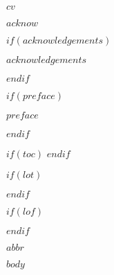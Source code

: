 \documentclass[12pt,oneside,a4paper]{reedthesis}
\begin{document}
\newpage
\makeabstract

\newpage
\makeabstracttr

\newpage
\begin{cve}
{\setlength{\parindent}{0pt}
$cv$
}
\end{cve}

\newpage
$acknow$

\newpage
\begin{dedice}
{\setlength{\parskip}{18pt}
\vspace*{\fill}
\par
\vspace*{\fill}
}
\end{dedice}

$if(acknowledgements)$
  \begin{acknowledgements}
    $acknowledgements$
  \end{acknowledgements}
$endif$

$if(preface)$
  \begin{preface}
    $preface$
  \end{preface}
$endif$

$if(toc)$
  \hypersetup{linkcolor=$if(toccolor)$$toccolor$$else$black$endif$}
  \setcounter{secnumdepth}{$num-depth$}
  \setcounter{tocdepth}{$toc-depth$}
  \tableofcontents
$endif$

$if(lot)$
  \listoftables
$endif$

$if(lof)$
  \listoffigures
$endif$

\newpage
\begin{abbre}
{\setlength{\parindent}{0pt}
$abbr$
}
\end{abbre}
\newpage
\setcounter{table}{0}

\setcounter{page}{1}
\mainmatter %
\pagestyle{plain} %
\renewcommand{\thepage}{\arabic{page}}%

$body$

\begingroup
\begin{singlespace}
\printbibliography[title=REFERENCES, heading=bibintoc]
\end{singlespace}
\endgroup
\end{document}
